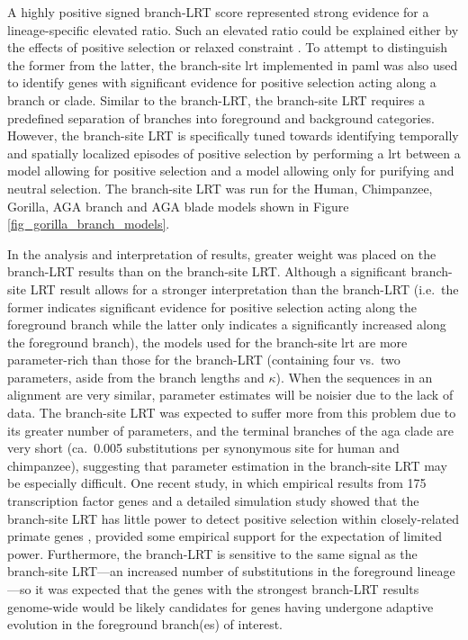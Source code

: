 A highly positive signed branch-LRT score represented strong evidence
for a lineage-specific elevated \dnds ratio. Such an elevated ratio
could be explained either by the effects of positive selection or
relaxed constraint \citep{Nielsen2005,Sequencing2005a}. To attempt to
distinguish the former from the latter, the branch-site \ac{lrt}
implemented in \ac{paml} \citep{Zhang2005} was also used to identify
genes with significant evidence for positive selection acting along a
branch or clade. Similar to the branch-LRT, the branch-site LRT
requires a predefined separation of branches into foreground and
background categories. However, the branch-site LRT is specifically
tuned towards identifying temporally and spatially localized episodes
of positive selection \citep{Nielsen1998,Yang2002b,Zhang2005} by
performing a \ac{lrt} between a model allowing for positive selection
and a model allowing only for purifying and neutral selection. The
branch-site LRT was run for the Human, Chimpanzee, Gorilla, AGA branch
and AGA blade models shown in Figure \ref{fig_gorilla_branch_models}.

In the analysis and interpretation of results, greater weight was
placed on the branch-LRT results than on the branch-site LRT. Although
a significant branch-site LRT result allows for a stronger
interpretation than the branch-LRT (i.e.\, the former indicates
significant evidence for positive selection acting along the
foreground branch while the latter only indicates a significantly
increased \dnds along the foreground branch), the models used for the
branch-site \ac{lrt} are more parameter-rich than those for the
branch-LRT (containing four vs.\ two parameters, aside from the branch
lengths and $\kappa$). When the sequences in an alignment are very
similar, parameter estimates will be noisier due to the lack of
data. The branch-site LRT was expected to suffer more from this
problem due to its greater number of parameters, and the terminal
branches of the \ac{aga} clade are very short (ca.\ 0.005
substitutions per synonymous site for human and chimpanzee),
suggesting that parameter estimation in the branch-site LRT may be
especially difficult. One recent study, in which empirical results
from 175 transcription factor genes and a detailed simulation study
showed that the branch-site LRT has little power to detect positive
selection within closely-related primate genes \citep{Nickel2008},
provided some empirical support for the expectation of limited
power. Furthermore, the branch-LRT is sensitive to the same signal as
the branch-site LRT---an increased number of substitutions in the
foreground lineage---so it was expected that the genes with the
strongest branch-LRT results genome-wide would be likely candidates
for genes having undergone adaptive evolution in the foreground
branch(es) of interest.

